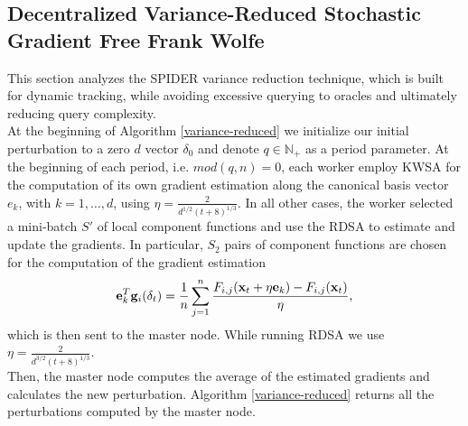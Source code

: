 \subsection{Decentralized Variance-Reduced Stochastic Gradient Free Frank Wolfe}
This section analyzes the SPIDER variance reduction technique, which is built for dynamic tracking, while avoiding excessive querying to oracles and ultimately reducing query complexity.\\
At the beginning of Algorithm \ref{variance-reduced} we initialize our initial perturbation to a zero $d$ vector \boldmath$\delta_0$ and denote $q \in \mathbb{N}_{+}$ as a period parameter. At the beginning of each period, i.e. $mod(q,n)=0$, each worker employ KWSA for the computation of its own gradient estimation along the canonical basis vector $e_k$, with $k=1, \dots, d$, using $\eta = \frac{2}{d^{1/2}(t+8)^{1/3}}$. In all other cases, the worker selected a mini-batch $ S'$ of local component functions and use the RDSA to estimate and update the gradients. In particular, $S_2$ pairs of component functions are chosen for the computation of the gradient estimation
\[\mathbf{e}_k^T\mathbf{g}_i(\text{\boldmath} \delta_t) = \frac{1}{n}\sum_{j=1}^{n}\frac{F_{i,j}(\mathbf{x}_t + \eta\mathbf{e}_k) - F_{i,j}(\mathbf{x}_t) }{\eta},\]
which is then sent to the master node. While running RDSA we use $\eta = \frac{2}{d^{3/2}(t+8)^{1/3}}$.\\
Then, the master node computes the average of the estimated gradients and calculates the new perturbation. Algorithm \ref{variance-reduced} returns all the perturbations computed by the master node.
